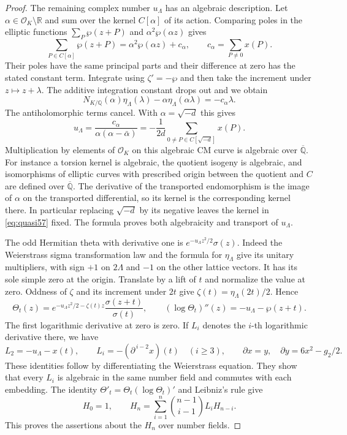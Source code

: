 \documentclass[a4paper,11pt]{article}
\theoremstyle{definition}
\theoremstyle{remark}
\newcommand{\RR}{\mathbb R}\newcommand{\CC}{\mathbb C}\newcommand{\QQ}{\mathbb Q}
\numberwithin{equation}{section}
\newcommand{\OO}{\mathcal O}
\begin{document}
\begin{proof}
The remaining complex number \(u_\Lambda\) has an algebraic
description. Let \(\alpha\in\OO_K\setminus\RR\) and sum over the
kernel \(C[\alpha]\) of its action. Comparing poles in the
elliptic functions \(\sum_P\wp(z+P)\) and
\(\alpha^2\wp(\alpha z)\) gives
\[
     \sum_{P\in C[\alpha]}\wp(z+P)=\alpha^2\wp(\alpha z)+c_\alpha,
             \qquad c_\alpha=\sum_{P\ne0}x(P).
\]
Their poles have the same principal parts and their difference at
zero has the stated constant term. Integrate using \(\zeta'=-\wp\)
and then take the increment under \(z\mapsto z+\lambda\).
The additive integration constant drops out and we obtain
\[
 N_{K/\QQ}(\alpha)\eta_\Lambda(\lambda)
          -\alpha\eta_\Lambda(\alpha\lambda)=-c_\alpha\lambda.
\]
The antiholomorphic terms cancel. With \(\alpha=\sqrt{-d}\) this
gives
\begin{equation}
  u_\Lambda=\frac{c_\alpha}{\alpha(\alpha-\bar\alpha)}
    =-\frac1{2d}\sum_{0\ne P\in C[\sqrt{-d}]}x(P).
                                                        \label{eq:quasi57}
\end{equation}
Multiplication by elements of \(\OO_K\) on this algebraic CM
curve is algebraic over \(\overline{\QQ}\). For instance a torsion
kernel is algebraic, the quotient isogeny is algebraic, and
isomorphisms of elliptic curves with prescribed origin between the
quotient and \(C\) are defined over \(\overline{\QQ}\).
The derivative of the transported endomorphism is the image of
\(\alpha\) on the transported differential, so its kernel is
the corresponding kernel there. In particular replacing
\(\sqrt{-d}\) by its negative leaves the kernel in
\eqref{eq:quasi57} fixed. The formula proves both algebraicity
and transport of \(u_\Lambda\).

The odd Hermitian theta with derivative one is
\(e^{-u_\Lambda z^2/2}\sigma(z)\). Indeed the Weierstrass sigma
transformation law and the formula for \(\eta_\Lambda\) give its
unitary multipliers, with sign \(+1\) on \(2\Lambda\) and \(-1\)
on the other lattice vectors. It has its sole simple zero at the
origin. Translate by a lift of \(t\) and normalize the value at
zero. Oddness of \(\zeta\) and its increment under \(2t\) give
\(\zeta(t)=\eta_\Lambda(2t)/2\). Hence
\[
  \Theta_t(z)=e^{-u_\Lambda z^2/2-\zeta(t)z}
                      \frac{\sigma(z+t)}{\sigma(t)},\qquad
       (\log\Theta_t)''(z)=-u_\Lambda-\wp(z+t).
\]
The first logarithmic derivative at zero is zero. If \(L_i\)
denotes the \(i\)-th logarithmic derivative there, we have
\[
 L_2=-u_\Lambda-x(t),\qquad L_i=-(\partial^{\,i-2}x)(t)
          \quad(i\ge3),\qquad
 \partial x=y,\quad \partial y=6x^2-g_2/2 .
\]
These identities follow by differentiating the Weierstrass
equation. They show that every \(L_i\) is algebraic in the same
number field and commutes with each embedding. The identity
\(\Theta'_t=\Theta_t(\log\Theta_t)'\) and Leibniz's rule give
\[
 H_0=1,\qquad H_n=\sum_{i=1}^n\binom{n-1}{i-1}L_i H_{n-i}.
\]
This proves the assertions about the \(H_n\) over number fields.


\end{proof}
\end{document}

